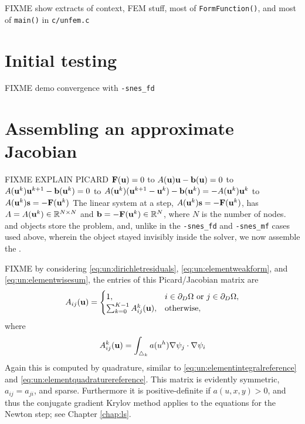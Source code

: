 FIXME show extracts of context, FEM stuff, most of \texttt{FormFunction()}, and most of \texttt{main()} in \texttt{c/\CODELOC unfem.c}







\section{Initial testing}

FIXME demo convergence with \texttt{-snes\_fd}


\section{Assembling an approximate Jacobian}

FIXME EXPLAIN PICARD $\mathbf{F}(\mathbf{u})=0$ to $A(\mathbf{u}) \mathbf{u} - \mathbf{b}(\mathbf{u})=0$ to $A(\mathbf{u}^k) \mathbf{u}^{k+1} - \mathbf{b}(\mathbf{u}^k)=0$ to $A(\mathbf{u}^k) (\mathbf{u}^{k+1}-\mathbf{u}^k) - \mathbf{b}(\mathbf{u}^k)= - A(\mathbf{u}^k) \mathbf{u}^k$ to $A(\mathbf{u}^k) \mathbf{s} = -\mathbf{F}(\mathbf{u}^k)$  The linear system at a step, $A(\mathbf{u}^k) \mathbf{s} = -\mathbf{F}(\mathbf{u}^k)$, has $A=A(\mathbf{u}^k)\in\mathbb{R}^{N\times N}$ and $\mathbf{b}=-\mathbf{F}(\mathbf{u}^k)\in\mathbb{R}^N$, where $N$ is the number of nodes.  \pMat and \pVec objects store the problem, and, unlike in the \texttt{-snes\_fd} and \texttt{-snes\_mf} cases used above, wherein the \pMat object stayed invisibly inside the \pSNES solver, we now assemble the \pMat.

FIXME by considering \eqref{eq:un:dirichletresiduals}, \eqref{eq:un:elementweakform}, and \eqref{eq:un:elementwisesum}, the entries of this Picard/Jacobian matrix are
\begin{equation}
A_{ij}(\mathbf{u}) =  \begin{cases}
               1, & i \in \partial_D\Omega \text{ or } j \in \partial_D\Omega, \\
               \sum_{k=0}^{K-1} A_{ij}^k(\mathbf{u}), & \text{otherwise},
               \end{cases} \label{eq:un:picardentry}
\end{equation}
where
\begin{equation}
A_{ij}^k(\mathbf{u}) = \int_{\triangle_k} a(u^h) \nabla\psi_j \cdot \nabla\psi_i \label{eq:un:picardentryelement}
\end{equation}
Again this is computed by quadrature, similar to \eqref{eq:un:elementintegralreference} and \eqref{eq:un:elementquadraturereference}.  This matrix is evidently symmetric, $a_{ij}=a_{ji}$, and sparse.  Furthermore it is positive-definite if $a(u,x,y)>0$, and thus the conjugate gradient Krylov method applies to the equations for the Newton step; see Chapter \ref{chap:ls}.

